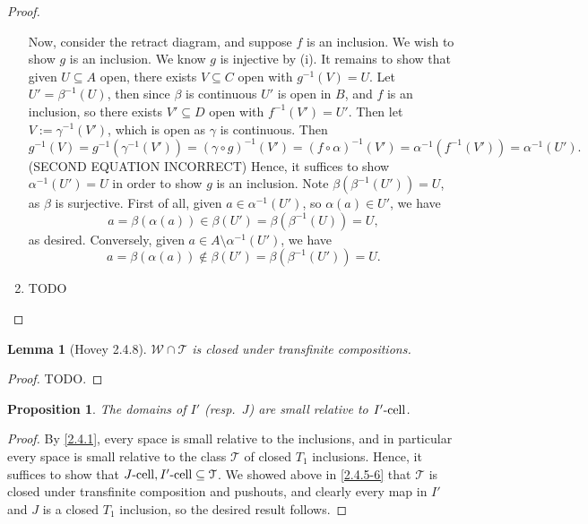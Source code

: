\documentclass{amsart}
\theoremstyle{plain}
\newtheorem{proposition}[theorem]{Proposition}
\newtheorem{lemma}[theorem]{Lemma}
\theoremstyle{definition}
\newcommand{\sseq}{\subseteq}
\newcommand{\0}{\mathbf{0}}
\newcommand{\cT}{\mathcal T}
\newcommand{\cW}{\mathcal W}
\renewcommand{\(}{\left(}
\renewcommand{\)}{\right)}
\newcommand{\cell}{\text-\mathrm{cell}}
\begin{document}
\begin{proof}
\begin{enumerate}[label=(\roman*),listparindent=\parindent,parsep=0pt]
    Now, consider the retract diagram, and suppose $f$ is an inclusion. We wish to show $g$ is an inclusion. We know $g$ is injective by (i). It remains to show that given $U\sseq A$ open, there exists $V\sseq C$ open with $g^{-1}(V)=U$. Let $U'=\beta^{-1}(U)$, then since $\beta$ is continuous $U'$ is open in $B$, and $f$ is an inclusion, so there exists $V'\sseq D$ open with $f^{-1}(V')=U'$. Then let $V:=\gamma^{-1}(V')$, which is open as $\gamma$ is continuous. Then 
    \[g^{-1}(V)=g^{-1}(\gamma^{-1}(V'))=(\gamma\circ g)^{-1}(V')=(f\circ\alpha)^{-1}(V')=\alpha^{-1}(f^{-1}(V'))=\alpha^{-1}(U').\]
    \color{red}(SECOND EQUATION INCORRECT) Hence, it suffices to show $\alpha^{-1}(U')=U$ in order to show $g$ is an inclusion. Note $\beta(\beta^{-1}(U'))=U$, as $\beta$ is surjective. First of all, given $a\in\alpha^{-1}(U')$, so $\alpha(a)\in U'$, we have 
    \[a=\beta(\alpha(a))\in\beta(U')=\beta(\beta^{-1}(U))= U,\]
    as desired. Conversely, given $a\in A\setminus\alpha^{-1}(U')$, we have
    \[a=\beta(\alpha(a))\notin\beta(U')=\beta(\beta^{-1}(U'))=U.\]
    \item \color{red}TODO
  \end{enumerate}
\end{proof}

\begin{lemma}[Hovey 2.4.8]\label{2.4.8}
  $\cW\cap\cT$ is closed under transfinite compositions.
\end{lemma}
\begin{proof}
  \color{red}TODO.
\end{proof}

\begin{proposition}\label{domains_of_I'/J_small_rel_I'-cell/J-cell}
  The domains of $I'$ (resp.\ $J$) are small relative to $I'\cell$.
\end{proposition}
\begin{proof}
  By \autoref{2.4.1}, every space is small relative to the inclusions, and in particular every space is small relative to the class $\cT$ of closed $T_1$ inclusions. Hence, it suffices to show that $J\cell,I'\cell\sseq\cT$. We showed above in \autoref{2.4.5-6} that $\cT$ is closed under transfinite composition and pushouts, and clearly every map in $I'$ and $J$ is a closed $T_1$ inclusion, so the desired result follows.
\end{proof}
\end{document}
